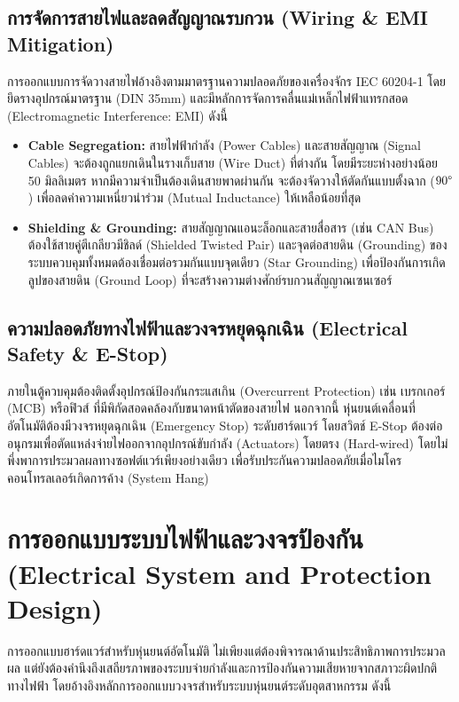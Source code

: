 \subsection{การจัดการสายไฟและลดสัญญาณรบกวน (Wiring \& EMI Mitigation)}
การออกแบบการจัดวางสายไฟอ้างอิงตามมาตรฐานความปลอดภัยของเครื่องจักร IEC 60204-1 โดยยึดรางอุปกรณ์มาตรฐาน (DIN 35mm) และมีหลักการจัดการคลื่นแม่เหล็กไฟฟ้าแทรกสอด (Electromagnetic Interference: EMI) ดังนี้
\begin{itemize}
    \item \textbf{Cable Segregation:} สายไฟฟ้ากำลัง (Power Cables) และสายสัญญาณ (Signal Cables) จะต้องถูกแยกเดินในรางเก็บสาย (Wire Duct) ที่ต่างกัน โดยมีระยะห่างอย่างน้อย 50 มิลลิเมตร หากมีความจำเป็นต้องเดินสายพาดผ่านกัน จะต้องจัดวางให้ตัดกันแบบตั้งฉาก ($90\degree$) เพื่อลดค่าความเหนี่ยวนำร่วม (Mutual Inductance) ให้เหลือน้อยที่สุด
    \item \textbf{Shielding \& Grounding:} สายสัญญาณแอนะล็อกและสายสื่อสาร (เช่น CAN Bus) ต้องใช้สายคู่ตีเกลียวมีชิลด์ (Shielded Twisted Pair) และจุดต่อสายดิน (Grounding) ของระบบควบคุมทั้งหมดต้องเชื่อมต่อรวมกันแบบจุดเดียว (Star Grounding) เพื่อป้องกันการเกิดลูปของสายดิน (Ground Loop) ที่จะสร้างความต่างศักย์รบกวนสัญญาณเซนเซอร์
\end{itemize}

\subsection{ความปลอดภัยทางไฟฟ้าและวงจรหยุดฉุกเฉิน (Electrical Safety \& E-Stop)}
ภายในตู้ควบคุมต้องติดตั้งอุปกรณ์ป้องกันกระแสเกิน (Overcurrent Protection) เช่น เบรกเกอร์ (MCB) หรือฟิวส์ ที่มีพิกัดสอดคล้องกับขนาดหน้าตัดของสายไฟ นอกจากนี้ หุ่นยนต์เคลื่อนที่อัตโนมัติต้องมีวงจรหยุดฉุกเฉิน (Emergency Stop) ระดับฮาร์ดแวร์ โดยสวิตช์ E-Stop ต้องต่ออนุกรมเพื่อตัดแหล่งจ่ายไฟออกจากอุปกรณ์ขับกำลัง (Actuators) โดยตรง (Hard-wired) โดยไม่พึ่งพาการประมวลผลทางซอฟต์แวร์เพียงอย่างเดียว เพื่อรับประกันความปลอดภัยเมื่อไมโครคอนโทรลเลอร์เกิดการค้าง (System Hang)

\section{การออกแบบระบบไฟฟ้าและวงจรป้องกัน (Electrical System and Protection Design)}
\label{sec:electrical_protection}

การออกแบบฮาร์ดแวร์สำหรับหุ่นยนต์อัตโนมัติ ไม่เพียงแต่ต้องพิจารณาด้านประสิทธิภาพการประมวลผล แต่ยังต้องคำนึงถึงเสถียรภาพของระบบจ่ายกำลังและการป้องกันความเสียหายจากสภาวะผิดปกติทางไฟฟ้า โดยอ้างอิงหลักการออกแบบวงจรสำหรับระบบหุ่นยนต์ระดับอุตสาหกรรม ดังนี้

